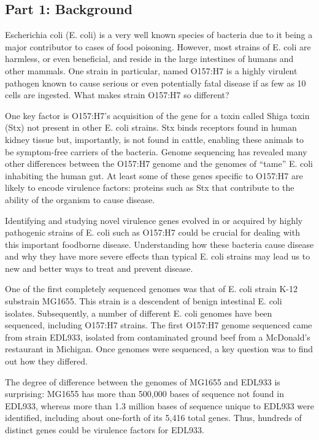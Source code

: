 \vspace*{-.1in}
\subsection*{Part 1: Background}
\vspace*{-.1in} 

Escherichia coli (E. coli) is a very well known species of bacteria due to it being a major contributor to cases of food poisoning.  However, most strains of E. coli are harmless, or even beneficial, and reside in the large intestines of humans and other mammals.  One strain in particular, named O157:H7 is a highly virulent pathogen known to cause serious or even potentially fatal disease if as few as 10 cells are ingested.  What makes strain O157:H7 so different?

One key factor is O157:H7's acquisition of the gene for a toxin called Shiga toxin (Stx) not present in other E. coli strains.  Stx binds receptors found in human kidney tissue but, importantly, is not found in cattle, enabling these animals to be symptom-free carriers of the bacteria.  Genome sequencing has revealed many other differences between the O157:H7 genome and the genomes of ``tame'' E. coli inhabiting the human gut.  At least some of these genes specific to O157:H7 are likely to encode virulence factors: proteins such as Stx that contribute to the ability of the organism to cause disease.

Identifying and studying novel virulence genes evolved in or acquired by highly pathogenic strains of E. coli such as O157:H7 could be crucial for dealing with this important foodborne disease.  Understanding how these bacteria cause disease and why they have more severe effects than typical E. coli strains may lead us to new and better ways to treat and prevent disease.  

One of the first completely sequenced genomes was that of E. coli strain K-12 substrain MG1655.  This strain is a descendent of benign intestinal E. coli isolates.  Subsequently, a number of different E. coli genomes have been sequenced, including O157:H7 strains.  The first O157:H7 genome sequenced came from strain EDL933, isolated from contaminated ground beef from a McDonald's restaurant in Michigan.  Once genomes were sequenced, a key question was to find out how they differed.  

The degree of difference between the genomes of MG1655 and EDL933 is surprising:  MG1655 has more than 500,000 bases of sequence not found in EDL933, whereas more than 1.3 million bases of sequence unique to EDL933 were identified, including about one-forth of its 5,416 total genes.  Thus, hundreds of distinct genes could be virulence factors for EDL933.

